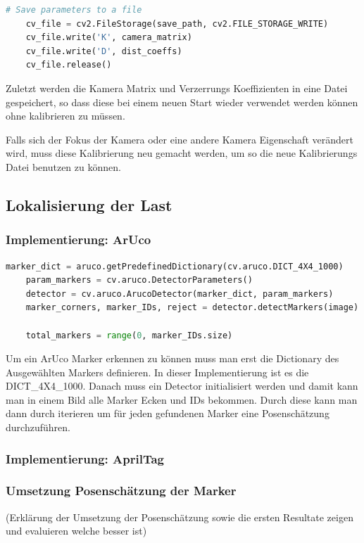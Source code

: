 \begin{lstlisting}[language=Python, caption=Speicherung der Kalibrierungs-Daten in einer Datei]
    # Save parameters to a file
    cv_file = cv2.FileStorage(save_path, cv2.FILE_STORAGE_WRITE)
    cv_file.write('K', camera_matrix)
    cv_file.write('D', dist_coeffs)
    cv_file.release()
\end{lstlisting}

Zuletzt werden die Kamera Matrix und Verzerrungs Koeffizienten in eine Datei gespeichert, so dass diese bei einem neuen Start wieder verwendet werden können ohne kalibrieren zu müssen.

Falls sich der Fokus der Kamera oder eine andere Kamera Eigenschaft verändert wird, muss diese Kalibrierung neu gemacht werden, um so die neue Kalibrierungs Datei benutzen zu können.

\subsection{Lokalisierung der Last}

\subsubsection{Implementierung: ArUco}

\begin{lstlisting}[language=Python, caption=ID und Ecken eines ArUco Markers erkennen]
    marker_dict = aruco.getPredefinedDictionary(cv.aruco.DICT_4X4_1000)
    param_markers = cv.aruco.DetectorParameters()
    detector = cv.aruco.ArucoDetector(marker_dict, param_markers)
    marker_corners, marker_IDs, reject = detector.detectMarkers(image)
    
    total_markers = range(0, marker_IDs.size)
\end{lstlisting}

Um ein ArUco Marker erkennen zu können muss man erst die Dictionary des Ausgewählten Markers definieren. 
In dieser Implementierung ist es die DICT_4X4_1000.
Danach muss ein Detector initialisiert werden und damit kann man in einem Bild alle Marker Ecken und IDs bekommen.
Durch diese kann man dann durch iterieren um für jeden gefundenen Marker eine Posenschätzung durchzuführen.

\subsubsection{Implementierung: AprilTag}

\subsubsection{Umsetzung Posenschätzung der Marker}
(Erklärung der Umsetzung der Posenschätzung sowie die ersten Resultate zeigen und evaluieren welche besser ist)

